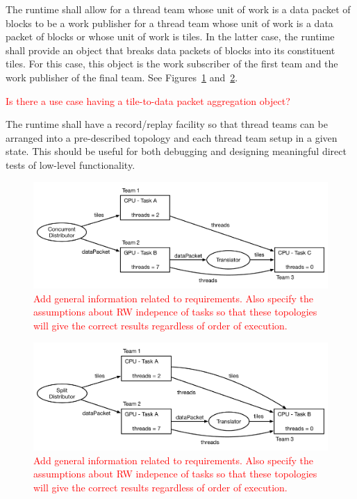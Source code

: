 \documentclass{article}
\begin{document}
\begin{req}
The runtime shall allow for a thread team whose unit of work is a data packet of
blocks to be a work publisher for a thread team whose unit of work is a data
packet of blocks or whose unit of work is tiles.  In the latter case, the
runtime shall provide an object that breaks data packets of blocks into its
constituent tiles.  For this case, this object is the work subscriber of the
first team and the work publisher of the final team.  See
Figures~\ref{fig:ConcurrentItor} and~\ref{fig:SplitItor}.
\end{req}

\textcolor{red}{Is there a use case having a tile-to-data packet aggregation
object?}

\begin{req}
The runtime shall have a record/replay facility so that thread teams can be
arranged into a pre-described topology and each thread team setup in a given
state.  This should be useful for both debugging and designing meaningful direct
tests of low-level functionality.
\end{req}

\begin{figure}[!ht]
\begin{center}
\includegraphics[width=5.5in]{ConcurrentItorExample.pdf}
\caption[]{\textcolor{red}{Add general information related to requirements.
Also specify the assumptions about RW indepence of tasks so that these
topologies will give the correct results regardless of order of execution.}}
\label{fig:ConcurrentItor}
\end{center}
\end{figure}

\begin{figure}[!ht]
\begin{center}
\includegraphics[width=5.5in]{WorkSplittingExample.pdf}
\caption[]{\textcolor{red}{Add general information related to requirements.
Also specify the assumptions about RW indepence of tasks so that these
topologies will give the correct results regardless of order of execution.}}
\label{fig:SplitItor}
\end{center}
\end{figure}
\end{document}
